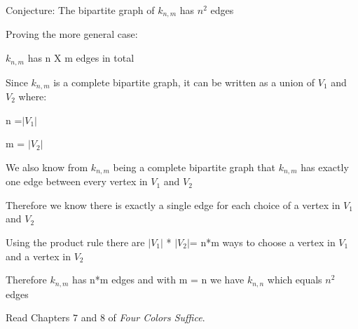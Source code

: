 \documentclass{article}
\begin{document}
{


Conjecture: The bipartite graph of $ k_{n,m}$ has $ n^{2}$ edges

Proving the more general case:

$ k_{n,m}$ has n X m edges in total

Since $ k_{n,m}$ is a complete bipartite graph, it can be written as a union of $ V_{1}$ and $ V_{2}$ where:

n =$ |V_{1}| $

m = $| V_{2}|$


We also know from $ k_{n,m}$ being a complete bipartite graph that $ k_{n,m}$ has exactly one edge between every vertex in $ V_{1}$ and $ V_{2}$

Therefore we know there is exactly a single edge for each choice of a vertex in $ V_{1}$ and $ V_{2}$

Using the product rule there are $|V_{1}|$ * $|V_{2}|$= n*m ways to choose a vertex in $ V_{1}$ and a vertex in $ V_{2}$

Therefore $ k_{n,m}$ has n*m edges and with m = n we have $ k_{n,n}$ which equals $ n^{2}$ edges

}




 

Read Chapters $7$ and $8$ of \emph{Four Colors Suffice}.
\end{document}
